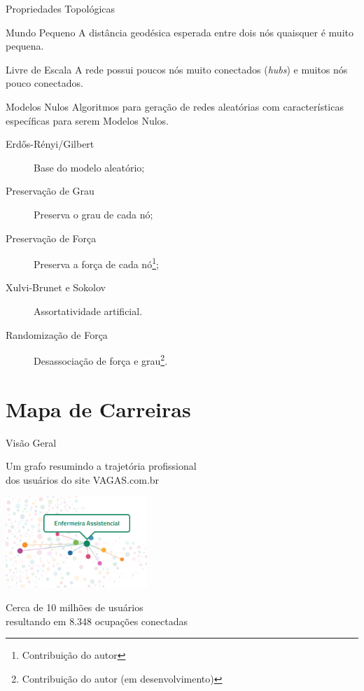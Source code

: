 \documentclass[10pt, hyperref={pdfpagelabels=false}]{beamer}
\begin{document}
\begin{frame}[label=propriedades]{Propriedades Topológicas}
  \begin{alertblock}{Mundo Pequeno}
    A distância geodésica esperada entre dois nós quaisquer é muito pequena.
  \end{alertblock}
  \begin{alertblock}{Livre de Escala}
    A rede possui poucos nós muito conectados (\textit{hubs}) e muitos nós pouco conectados.
  \end{alertblock}
\end{frame}

\begin{frame}[label=modelos-nulos]{Modelos Nulos}
  Algoritmos para geração de redes aleatórias com características específicas para serem \alert{Modelos Nulos}.
  \begin{description}
    \item[Erdős-Rényi/Gilbert] Base do modelo aleatório;
    \item[Preservação de Grau] Preserva o grau de cada nó;
    \item[Preservação de Força] Preserva a força de cada nó\footnote{Contribuição do autor};
    \item[Xulvi-Brunet e Sokolov] Assortatividade artificial.
    \item[Randomização de Força] Desassociação de força e grau\footnote{Contribuição do autor (em desenvolvimento)}.
  \end{description}
\end{frame}

\section{Mapa de Carreiras}

{
\begin{frame}[label=mapa-visao-geral]{Visão Geral}
  \begin{center}
    Um grafo resumindo a trajetória profissional\\dos usuários do site VAGAS.com.br

    \includegraphics[width=0.4\textwidth]{mapa-enfermeira-assistencial}

  Cerca de \alert{10 milhões} de usuários\\resultando em \alert{8.348 ocupações} conectadas
  \end{center}
\end{frame}
}
\end{document}
